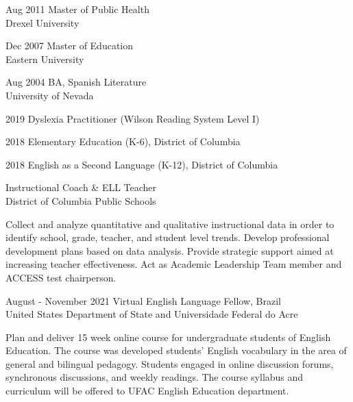 \documentclass[]{scrartcl}
\begin{document}
\begin{cleanCV}

  \vspace{-0.50em}

\WorkExperience
{Aug 2011}
{Master of Public Health}
{\\Drexel University}
\vspace{-0.5em}

\WorkExperience
{Dec 2007}
{Master of Education}
{\\Eastern University}
\vspace{-0.5em}

\WorkExperience
{Aug 2004}
{BA, Spanish Literature}
{\\University of Nevada}
\vspace{-0.5em}


\WorkExperience
{2019}
{}
{Dyslexia Practitioner (Wilson Reading System Level I)}
\vspace{-1.25em}

\WorkExperience
{2018}
{}
{Elementary Education (K-6), District of Columbia}
\vspace{-1.25em}

\WorkExperience
{2018}
{}
{English as a Second Language (K-12), District of Columbia}
\vspace{-1.25em}

\vspace{0.50em}

{Instructional Coach \& ELL Teacher}
{\\District of Columbia Public Schools}

{ Collect and analyze quantitative and qualitative instructional data in order to identify school, grade, teacher, and student level trends. Develop professional development plans based on data analysis. Provide strategic support aimed at increasing teacher effectiveness. Act as Academic Leadership Team member and ACCESS test chairperson.}


\WorkExperience
{August - November 2021}
{Virtual English Language Fellow, Brazil\\}
{United States Department of State and Universidade Federal do Acre}

\JobDesc{}
{Plan and deliver 15 week online course for undergraduate students of English Education. The course was developed students' English vocabulary in the area of general and bilingual pedagogy. Students engaged in online discussion forums, synchronous discussions, and weekly readings. The course syllabus and curriculum will be offered to UFAC English Education department.}


\end{cleanCV}
\end{document}
